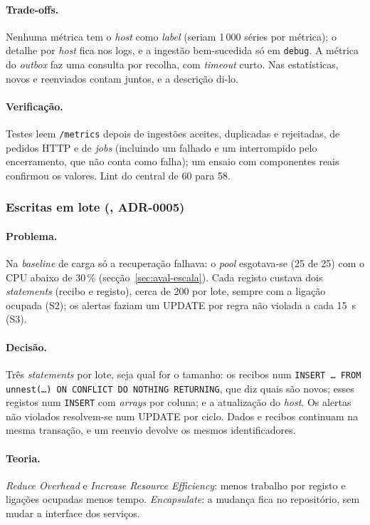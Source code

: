 \paragraph{Trade-offs.}
Nenhuma métrica tem o \emph{host} como \emph{label} (seriam 1\,000 séries por métrica); o detalhe por \emph{host}
fica nos logs, e a ingestão bem-sucedida só em \texttt{debug}. A métrica do \emph{outbox} faz uma consulta por
recolha, com \emph{timeout} curto. Nas estatísticas, novos e reenviados contam juntos, e a descrição di-lo.

\paragraph{Verificação.}
Testes leem \texttt{/metrics} depois de ingestões aceites, duplicadas e rejeitadas, de pedidos HTTP e de
\emph{jobs} (incluindo um falhado e um interrompido pelo encerramento, que não conta como falha); um ensaio com
componentes reais confirmou os valores. Lint do central de 60 para 58.

\subsubsection{Escritas em lote (, ADR-0005)}
\label{sec:d5}

\paragraph{Problema.}
Na \emph{baseline} de carga só a recuperação falhava: o \emph{pool} esgotava-se (25 de 25) com o CPU abaixo de 30\,\%
(secção~\ref{sec:aval-escala}). Cada registo custava dois \emph{statements} (recibo e registo), cerca de 200 por
lote, sempre com a ligação ocupada (S2); os alertas faziam um UPDATE por regra não violada a cada 15~s (S3).

\paragraph{Decisão.}
Três \emph{statements} por lote, seja qual for o tamanho: os recibos num \texttt{INSERT \ldots{} FROM
unnest(\ldots) ON CONFLICT DO NOTHING RETURNING}, que diz quais são novos; esses registos num \texttt{INSERT} com
\emph{arrays} por coluna; e a atualização do \emph{host}. Os alertas não violados resolvem-se num UPDATE por ciclo.
Dados e recibos continuam na mesma transação, e um reenvio devolve os mesmos identificadores.

\paragraph{Teoria.}
\emph{Reduce Overhead} e \emph{Increase Resource Efficiency}: menos trabalho por registo e ligações ocupadas
menos tempo. \emph{Encapsulate}: a mudança fica no repositório, sem mudar a interface dos serviços.

